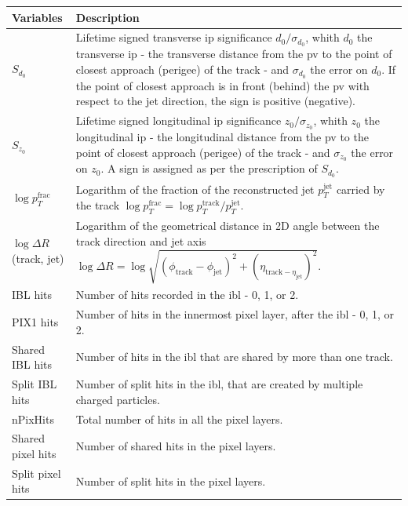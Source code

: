 \begin{table}[h]
  \begin{center}
      \begin{tabular}{C{3cm}|C{13cm}} 
      	 \hline \hline
          Variables & Description  \\ \hline
          $S_{d_0}$      & Lifetime signed transverse \gls{ip} significance $d_0 / \sigma_{d_0}$, whith $d_0$ the transverse \gls{ip} - the transverse distance from the \gls{pv} to the point of closest approach (perigee) of the track - and $\sigma_{d_0}$ the error on $d_0$. If the point of closest approach is in front (behind) the \gls{pv} with respect to the jet direction, the sign is positive (negative). \\ \hline
          $S_{z_0}$      & Lifetime signed longitudinal \gls{ip} significance $z_0 / \sigma_{z_0}$, whith $z_0$ the longitudinal \gls{ip} - the longitudinal distance from the \gls{pv} to the point of closest approach (perigee) of the track - and $\sigma_{z_0}$ the error on $z_0$. A sign is assigned as per the prescription of $S_{d_0}$. \\ \hline
          $\log p_T^{\textrm{frac}}$   & Logarithm of the fraction of the reconstructed jet $p_T^{\textrm{jet}}$ carried by the track $\log p_T^{\textrm{frac}} = \log p_T^{\textrm{track}} / p_T^{\textrm{jet}}$. \\ \hline
          $\log \Delta R$(track, jet) & Logarithm of the geometrical distance in 2D angle between the track direction and jet axis $\log \Delta R = \log \sqrt{(\phi_{\textrm{track}} - \phi_{\textrm{jet}})^2 + (\eta_{\textrm{track} - \eta_{\textrm{jet}}})^2}$. \\ \hline
          IBL hits      & Number of hits recorded in the \gls{ibl} - 0, 1, or 2. \\ \hline
          PIX1 hits       & Number of hits in the innermost pixel layer, after the \gls{ibl} - 0, 1, or 2.  \\ \hline
          Shared IBL hits & Number of hits in the \gls{ibl} that are shared by more than one track. \\ \hline
          Split IBL hits  & Number of split hits in the \gls{ibl}, that are created by multiple charged particles. \\ \hline
          nPixHits        & Total number of hits in all the pixel layers.\\ \hline
          Shared pixel hits & Number of shared hits in the pixel layers.\\ \hline
          Split pixel hits  & Number of split hits in the pixel layers.\\ \hline

\end{tabular}
\end{center}
\end{table}
